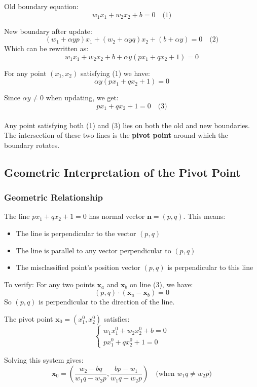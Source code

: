\begin{notechapter}
Old boundary equation:
\[
w_1 x_1 + w_2 x_2 + b = 0 \quad \text{(1)}
\]

\noindent New boundary after update:
\[
(w_1 + \alpha y p)x_1 + (w_2 + \alpha y q)x_2 + (b + \alpha y) = 0 
\quad \text{(2)}
\] 
Which can be rewritten as:
\[
w_1 x_1 + w_2 x_2 + b + \alpha y (p x_1 + q x_2 + 1) = 0
\]

\noindent For any point $(x_1, x_2)$ satisfying (1) we have:
\[
\alpha y (p x_1 + q x_2 + 1) = 0
\]

\noindent Since $\alpha y \neq 0$ when updating, we get:
\[
p x_1 + q x_2 + 1 = 0 \quad \text{(3)}
\]
\\
Any point satisfying both (1) and (3) lies on both the old and new boundaries.\\
The intersection of these two lines is the \textbf{pivot point} around which
the boundary rotates.

\subsection{Geometric Interpretation of the Pivot Point}

\subsubsection{Geometric Relationship}

The line $p x_1 + q x_2 + 1 = 0$ has normal vector $\mathbf{n} = (p, q)$. This means:

\begin{itemize}
    \item The line is perpendicular to the vector $(p, q)$
    \item The line is parallel to any vector perpendicular to $(p, q)$
    \item The misclassified point's position vector $(p, q)$ is perpendicular
    to this line
\end{itemize}

To verify: For any two points $\mathbf{x}_a$ and $\mathbf{x}_b$ on line (3), we have:
\[
(p, q) \cdot (\mathbf{x}_a - \mathbf{x}_b) = 0
\]
So $(p, q)$ is perpendicular to the direction of the line.

The pivot point $\mathbf{x}_0 = (x_1^0, x_2^0)$ satisfies:
\[
\begin{cases}
w_1 x_1^0 + w_2 x_2^0 + b = 0 \\
p x_1^0 + q x_2^0 + 1 = 0
\end{cases}
\]

Solving this system gives:
\[
\mathbf{x}_0 = \left( \frac{w_2 - bq}{w_1q - w_2p}, \frac{bp - w_1}{w_1q - w_2p} \right) \quad \text{(when } w_1q \neq w_2p\text{)}
\]


\end{notechapter}
